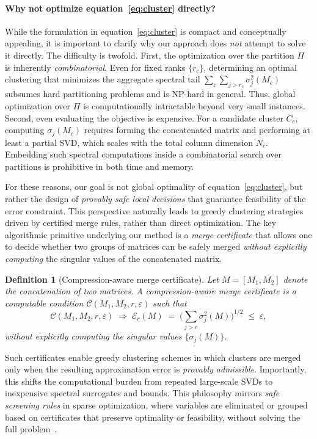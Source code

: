 \documentclass[10pt]{article} %
\def\eqref#1{equation~\ref{#1}}
\newtheorem{definition}{Definition}
\begin{document}
\paragraph{Why not optimize \eqref{eq:cluster} directly?}
While the formulation in \eqref{eq:cluster} is compact and conceptually appealing, it is important to clarify why our approach does \emph{not} attempt to solve it directly.
The difficulty is twofold. First, the optimization over the partition $\Pi$ is inherently \emph{combinatorial}.
Even for fixed ranks $\{r_c\}$, determining an optimal clustering that minimizes the aggregate spectral tail
$\sum_{c}\sum_{j>r_c}\sigma_j^2(M_c)$ subsumes hard partitioning problems and is NP-hard in general.
Thus, global optimization over $\Pi$ is computationally intractable beyond very small instances. Second, even evaluating the objective is expensive.
For a candidate cluster $C_c$, computing $\sigma_j(M_c)$ requires forming the concatenated matrix and performing at least a partial SVD, which scales with the total column dimension $N_c$.
Embedding such spectral computations inside a combinatorial search over partitions is prohibitive in both time and memory.

For these reasons, our goal is not global optimality of \eqref{eq:cluster}, but rather the design of \emph{provably safe local decisions} that guarantee feasibility of the error constraint.
This perspective naturally leads to greedy clustering strategies driven by certified merge rules, rather than direct optimization. The key algorithmic primitive underlying our method is a \emph{merge certificate} that allows one to decide whether two groups of matrices can be safely merged \emph{without explicitly computing} the singular values of the concatenated matrix.

\begin{definition}[Compression-aware merge certificate]
\label{def:merge_certificate}
Let $M=[M_1,M_2]$ denote the concatenation of two matrices.
A compression-aware merge certificate is a computable condition $\mathcal{C}(M_1,M_2,r,\varepsilon)$ such that
\[
\mathcal{C}(M_1,M_2,r,\varepsilon)\;\Longrightarrow\;
\mathcal{E}_r(M)
\;=\;
\Bigg(\sum_{j>r}\sigma_j^2(M)\Bigg)^{1/2}
\;\le\;\varepsilon,
\]
without explicitly computing the singular values $\{\sigma_j(M)\}$.
\end{definition}

Such certificates enable greedy clustering schemes in which clusters are merged only when the resulting approximation error is \emph{provably admissible}.
Importantly, this shifts the computational burden from repeated large-scale SVDs to inexpensive spectral surrogates and bounds. This philosophy mirrors \emph{safe screening rules} in sparse optimization, where variables are eliminated or grouped based on certificates that preserve optimality or feasibility, without solving the full problem~\citep{ghaoui2010safe, fercoq2015mind}.
\end{document}
